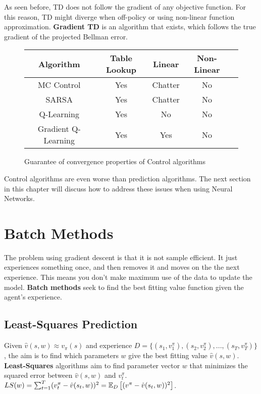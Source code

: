As seen before, TD does not follow the gradient of any objective function. For this reason, TD might diverge when off-policy or using non-linear function approximation. \textbf{Gradient TD} is an algorithm that exists, which follows the true gradient of the projected Bellman error.

\begin{figure}[H]
	\centering
	\begin{tabular}{| c | c | c | c | c |}
		\hline
		Algorithm & Table Lookup & Linear & Non-Linear\\
		\hline
		\hline
		MC Control & Yes & Chatter & No\\
		\hline
		SARSA & Yes & Chatter & No\\
		\hline
		Q-Learning & Yes & No & No\\
		\hline
		Gradient Q-Learning & Yes & Yes & No\\
		\hline
	\end{tabular}
	\caption{Guarantee of convergence properties of Control algorithms}
\end{figure}

Control algorithms are even worse than prediction algorithms. The next section in this chapter will discuss how to address these issues when using Neural Networks.

\section{Batch Methods}

The problem using gradient descent is that it is not sample efficient. It just experiences something once, and then removes it and moves on the the next experience. This means you don't make maximum use of the data to update the model. \textbf{Batch methods} seek to find the best fitting value function given the agent's experience.

\subsection{Least-Squares Prediction}

Given $\hat{v}(s, w) \approx v_\pi(s)$ and experience $D = \{(s_1, v_1^\pi), (s_2, v_2^\pi), ..., (s_T, v_T^\pi)\}$, the aim is to find which parameters $w$ give the best fitting value $\hat{v}(s, w)$. \textbf{Least-Squares} algorithms aim to find parameter vector $w$ that minimizes the squared error between $\hat{v}(s, w)$ and $v_t^\pi$. $LS(w) = \sum^T_{t = 1} (v_t^\pi - \hat{v}(s_t, w))^2 = \operatorname{\mathbb{E}}_D \left[(v^\pi - \hat{v}(s_t, w))^2\right]$.

